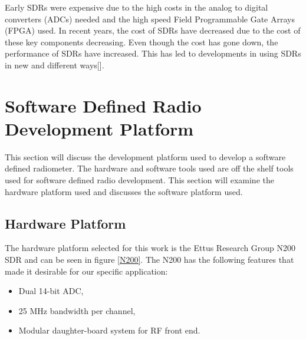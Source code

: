 Early SDRs were expensive due to the high costs in the analog to digital converters (ADCs) needed and the high speed Field Programmable Gate Arrays (FPGA) used.  In recent years, the cost of SDRs have decreased due to the cost of these key components decreasing.  Even though the cost has gone down, the performance of SDRs have increased.  This has led to developments in using SDRs in new and different ways[\cite{jondral2005software}].



\section{Software Defined Radio Development Platform} \label{SDR_platform}
This section will discuss the development platform used to develop a software defined radiometer.  The hardware and software tools used are off the shelf tools used for software defined radio development.  This section will examine the hardware platform used and discusses the software platform used.  


\subsection{Hardware Platform}
The hardware platform selected for this work is the Ettus Research Group N200 SDR and can be seen in figure \ref{N200}.  The N200 has the following features that made it desirable for our specific application:

\begin{itemize}
\item Dual 14-bit ADC,
\item 25 MHz bandwidth per channel,
\item Modular daughter-board system for RF front end.
\end{itemize}

